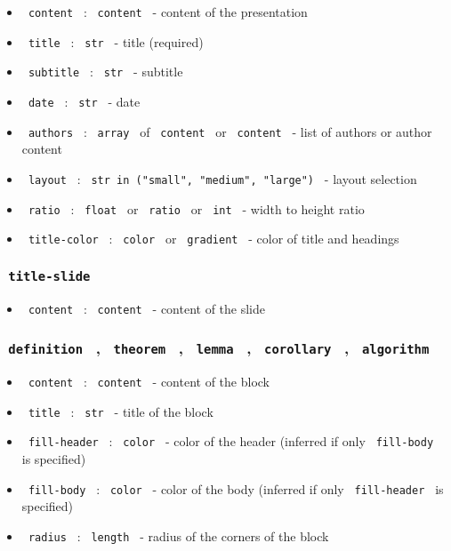 \begin{itemize}
\tightlist
\item
  \texttt{\ content\ } : \texttt{\ content\ } - content of the
  presentation
\item
  \texttt{\ title\ } : \texttt{\ str\ } - title (required)
\item
  \texttt{\ subtitle\ } : \texttt{\ str\ } - subtitle
\item
  \texttt{\ date\ } : \texttt{\ str\ } - date
\item
  \texttt{\ authors\ } : \texttt{\ array\ } of \texttt{\ content\ } or
  \texttt{\ content\ } - list of authors or author content
\item
  \texttt{\ layout\ } :
  \texttt{\ str\ in\ ("small",\ "medium",\ "large")\ } - layout
  selection
\item
  \texttt{\ ratio\ } : \texttt{\ float\ } or \texttt{\ ratio\ } or
  \texttt{\ int\ } - width to height ratio
\item
  \texttt{\ title-color\ } : \texttt{\ color\ } or \texttt{\ gradient\ }
  - color of title and headings
\end{itemize}

\subsubsection{\texorpdfstring{\texttt{\ title-slide\ }}{ title-slide }}\label{title-slide}

\begin{itemize}
\tightlist
\item
  \texttt{\ content\ } : \texttt{\ content\ } - content of the slide
\end{itemize}

\subsubsection{\texorpdfstring{\texttt{\ definition\ } ,
\texttt{\ theorem\ } , \texttt{\ lemma\ } , \texttt{\ corollary\ } ,
\texttt{\ algorithm\ }}{ definition  ,  theorem  ,  lemma  ,  corollary  ,  algorithm }}\label{definition-theorem-lemma-corollary-algorithm}

\begin{itemize}
\tightlist
\item
  \texttt{\ content\ } : \texttt{\ content\ } - content of the block
\item
  \texttt{\ title\ } : \texttt{\ str\ } - title of the block
\item
  \texttt{\ fill-header\ } : \texttt{\ color\ } - color of the header
  (inferred if only \texttt{\ fill-body\ } is specified)
\item
  \texttt{\ fill-body\ } : \texttt{\ color\ } - color of the body
  (inferred if only \texttt{\ fill-header\ } is specified)
\item
  \texttt{\ radius\ } : \texttt{\ length\ } - radius of the corners of
  the block
\end{itemize}

